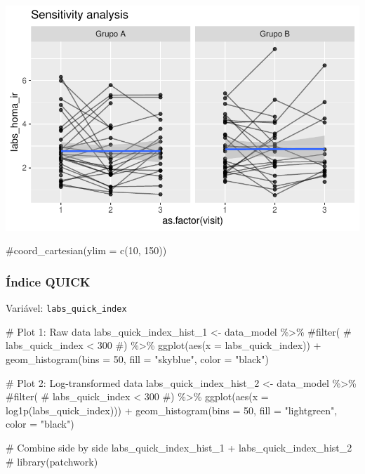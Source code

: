 \documentclass[
  12pt,
]{article}
\newenvironment{Shaded}{\begin{snugshade}}{\end{snugshade}}
\newcommand{\AttributeTok}[1]{\textcolor[rgb]{0.40,0.45,0.13}{#1}}
\newcommand{\CommentTok}[1]{\textcolor[rgb]{0.37,0.37,0.37}{#1}}
\newcommand{\DecValTok}[1]{\textcolor[rgb]{0.68,0.00,0.00}{#1}}
\newcommand{\FunctionTok}[1]{\textcolor[rgb]{0.28,0.35,0.67}{#1}}
\newcommand{\NormalTok}[1]{\textcolor[rgb]{0.00,0.23,0.31}{#1}}
\newcommand{\OtherTok}[1]{\textcolor[rgb]{0.00,0.23,0.31}{#1}}
\newcommand{\SpecialCharTok}[1]{\textcolor[rgb]{0.37,0.37,0.37}{#1}}
\newcommand{\StringTok}[1]{\textcolor[rgb]{0.13,0.47,0.30}{#1}}
\begin{document}
\includegraphics{Outcomes_files/figure-pdf/labs_homa_ir_6-2.pdf}

\begin{Shaded}
\begin{Highlighting}[]
    \CommentTok{\#coord\_cartesian(ylim = c(10, 150))}
\end{Highlighting}
\end{Shaded}

\subsubsection{Índice QUICK}\label{uxedndice-quick}

Variável: \texttt{labs\_quick\_index}

\begin{Shaded}
\begin{Highlighting}[]
\CommentTok{\# Plot 1: Raw data}
\NormalTok{labs\_quick\_index\_hist\_1 }\OtherTok{\textless{}{-}}\NormalTok{ data\_model }\SpecialCharTok{\%\textgreater{}\%} 
    \CommentTok{\#filter(}
    \CommentTok{\#    labs\_quick\_index \textless{} 300}
    \CommentTok{\#) \%\textgreater{}\% }
    \FunctionTok{ggplot}\NormalTok{(}\FunctionTok{aes}\NormalTok{(}\AttributeTok{x =}\NormalTok{ labs\_quick\_index)) }\SpecialCharTok{+} 
    \FunctionTok{geom\_histogram}\NormalTok{(}\AttributeTok{bins =} \DecValTok{50}\NormalTok{, }\AttributeTok{fill =} \StringTok{"skyblue"}\NormalTok{, }\AttributeTok{color =} \StringTok{"black"}\NormalTok{)}

\CommentTok{\# Plot 2: Log{-}transformed data}
\NormalTok{labs\_quick\_index\_hist\_2 }\OtherTok{\textless{}{-}}\NormalTok{ data\_model }\SpecialCharTok{\%\textgreater{}\%} 
    \CommentTok{\#filter(}
    \CommentTok{\#    labs\_quick\_index \textless{} 300}
    \CommentTok{\#) \%\textgreater{}\%}
    \FunctionTok{ggplot}\NormalTok{(}\FunctionTok{aes}\NormalTok{(}\AttributeTok{x =} \FunctionTok{log1p}\NormalTok{(labs\_quick\_index))) }\SpecialCharTok{+} 
    \FunctionTok{geom\_histogram}\NormalTok{(}\AttributeTok{bins =} \DecValTok{50}\NormalTok{, }\AttributeTok{fill =} \StringTok{"lightgreen"}\NormalTok{, }\AttributeTok{color =} \StringTok{"black"}\NormalTok{)}

\CommentTok{\# Combine side by side}
\NormalTok{labs\_quick\_index\_hist\_1 }\SpecialCharTok{+}\NormalTok{ labs\_quick\_index\_hist\_2 }\CommentTok{\# library(patchwork)}
\end{Highlighting}
\end{Shaded}
\end{document}
